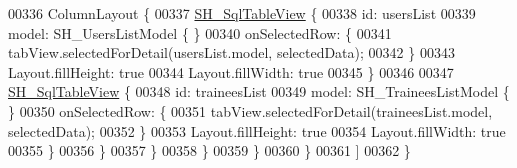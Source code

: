 \begin{DoxyCode}
00336                         ColumnLayout \{
00337                             \hyperlink{classSH__SqlTableView}{SH\_SqlTableView} \{
00338                                 \textcolor{keywordtype}{id}: usersList
00339                                 model: SH\_UsersListModel \{ \}
00340                                 onSelectedRow: \{
00341                                     tabView.selectedForDetail(usersList.model, selectedData);
00342                                 \}
00343                                 Layout.fillHeight: \textcolor{keyword}{true}
00344                                 Layout.fillWidth: \textcolor{keyword}{true}
00345                             \}
00346 
00347                             \hyperlink{classSH__SqlTableView}{SH\_SqlTableView} \{
00348                                 \textcolor{keywordtype}{id}: traineesList
00349                                 model: SH\_TraineesListModel \{ \}
00350                                 onSelectedRow: \{
00351                                     tabView.selectedForDetail(traineesList.model, selectedData);
00352                                 \}
00353                                 Layout.fillHeight: \textcolor{keyword}{true}
00354                                 Layout.fillWidth: \textcolor{keyword}{true}
00355                             \}
00356                         \}
00357                     \}
00358                 \}
00359             \}
00360         \}
00361     ]
00362 \}
\end{DoxyCode}
